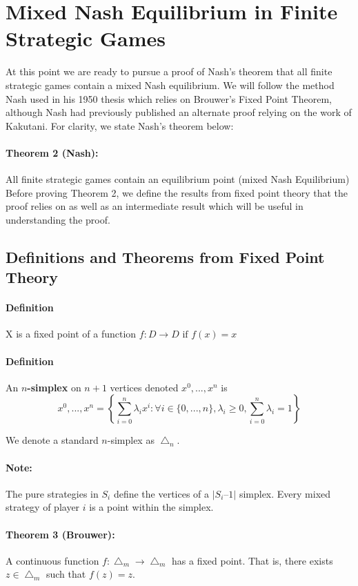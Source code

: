 \documentclass[12pt]{article}
\newcommand{\Note}{\paragraph{Note:}}
\newcommand{\Definition}{\paragraph{Definition}}
\begin{document}
\section{Mixed Nash Equilibrium in Finite Strategic Games}

At this point we are ready to pursue a proof of Nash's theorem that all finite strategic games contain a mixed Nash equilibrium. We will follow the method Nash used in his 1950 thesis which relies on Brouwer's Fixed Point Theorem, although Nash had previously published an alternate proof relying on the work of Kakutani. For clarity, we state Nash's theorem below:

\paragraph{Theorem 2 (Nash):} All finite strategic games contain an equilibrium point (mixed Nash Equilibrium)\\

Before proving Theorem 2, we define the results from fixed point theory that the proof relies on as well as an intermediate result which will be useful in understanding the proof.

\subsection{Definitions and Theorems from Fixed Point Theory}

\Definition X is a fixed point of a function $f: D \rightarrow D \text{ if } f(x) = x$

\Definition An \textbf{$n$-simplex} on $n+1$ vertices denoted $x^0,...,x^n$ is 
\begin{equation*}
x^0,...,x^n = \left \{ \sum\limits_{i=0}^n \lambda_i x^i : \forall i \in \{0,...,n\}, \lambda_i \geq 0, \sum\limits_{i = 0}^n \lambda_i = 1 \right \}
\end{equation*}

We denote a standard $n$-simplex as $\bigtriangleup_n$.

\Note The pure strategies in $S_i$ define the vertices of a $|S_i – 1|$ simplex. Every mixed strategy of player $i$ is a point within the simplex. 

\paragraph{Theorem 3 (Brouwer):} A continuous function $f: \bigtriangleup_m \rightarrow \bigtriangleup_m$ has a fixed point. That is, there exists $z \in \bigtriangleup_m$ such that $f(z) = z$.
\end{document}
